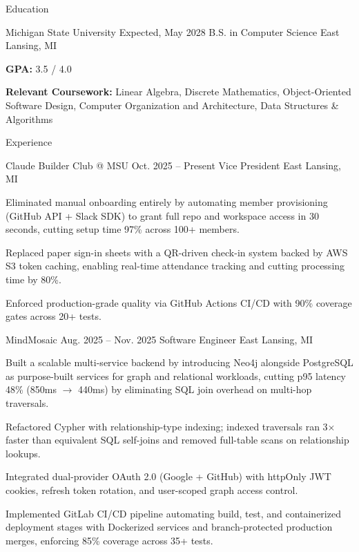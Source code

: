 \documentclass[
	11pt
]{../../../resume}
\begin{document}
	\begin{rSection}{E}{ducation}
		\begin{rSectionEntry}
			{Michigan State University}
			{Expected, May 2028}
			{B.S. in Computer Science}
			{}
			{East Lansing, MI}

			\item \textbf{GPA:} 3.5 / 4.0
			\item \textbf{Relevant Coursework:} Linear Algebra, Discrete Mathematics, Object-Oriented Software Design, Computer Organization and Architecture, Data Structures \& Algorithms
		\end{rSectionEntry}
	\end{rSection}

	\begin{rSection}{E}{xperience}
		\begin{rSectionEntry}
			{Claude Builder Club @ MSU}
			{Oct. 2025 -- Present}
			{Vice President}
			{}
			{East Lansing, MI}

			\item Eliminated manual onboarding entirely by automating member provisioning (GitHub API + Slack SDK) to grant full repo and workspace access in 30 seconds, cutting setup time 97\% across 100+ members.
			\item Replaced paper sign-in sheets with a QR-driven check-in system backed by AWS S3 token caching, enabling real-time attendance tracking and cutting processing time by 80\%.
			\item Enforced production-grade quality via GitHub Actions CI/CD with 90\% coverage gates across 20+ tests.
		\end{rSectionEntry}

		\begin{rSectionEntry}
			{MindMosaic}
			{Aug. 2025 -- Nov. 2025}
			{Software Engineer}
			{}
			{East Lansing, MI}

			\item Built a scalable multi-service backend by introducing Neo4j alongside PostgreSQL as purpose-built services for graph and relational workloads, cutting p95 latency 48\% (850ms $\rightarrow$ 440ms) by eliminating SQL join overhead on multi-hop traversals.
			\item Refactored Cypher with relationship-type indexing; indexed traversals ran 3$\times$ faster than equivalent SQL self-joins and removed full-table scans on relationship lookups.
			\item Integrated dual-provider OAuth 2.0 (Google + GitHub) with httpOnly JWT cookies, refresh token rotation, and user-scoped graph access control.
			\item Implemented GitLab CI/CD pipeline automating build, test, and containerized deployment stages with Dockerized services and branch-protected production merges, enforcing 85\% coverage across 35+ tests.
		\end{rSectionEntry}
	\end{rSection}
\end{document}
